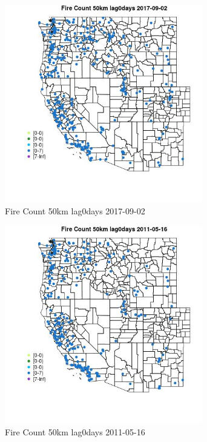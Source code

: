 \begin{figure} 
\centering  
\includegraphics[width=0.77\textwidth]{Code_Outputs/Report_ML_input_PM25_Step4_part_e_de_duplicated_aves_compiled_2019-05-20wNAs_MapObsFire_Count_50km_lag0days2017-09-02.jpg} 
\caption{\label{fig:Report_ML_input_PM25_Step4_part_e_de_duplicated_aves_compiled_2019-05-20wNAsMapObsFire_Count_50km_lag0days2017-09-02}Fire Count 50km lag0days 2017-09-02} 
\end{figure} 
 

\begin{figure} 
\centering  
\includegraphics[width=0.77\textwidth]{Code_Outputs/Report_ML_input_PM25_Step4_part_e_de_duplicated_aves_compiled_2019-05-20wNAs_MapObsFire_Count_50km_lag0days2011-05-16.jpg} 
\caption{\label{fig:Report_ML_input_PM25_Step4_part_e_de_duplicated_aves_compiled_2019-05-20wNAsMapObsFire_Count_50km_lag0days2011-05-16}Fire Count 50km lag0days 2011-05-16} 
\end{figure} 
 

